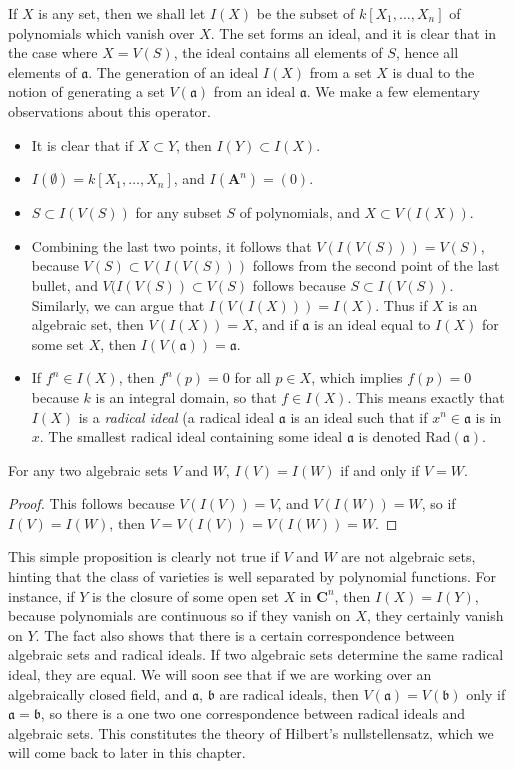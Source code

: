 If $X$ is any set, then we shall let $I(X)$ be the subset of $k[X_1, \dots, X_n]$ of polynomials which vanish over $X$. The set forms an ideal, and it is clear that in the case where $X = V(S)$, the ideal contains all elements of $S$, hence all elements of $\mathfrak{a}$. The generation of an ideal $I(X)$ from a set $X$ is dual to the notion of generating a set $V(\mathfrak{a})$ from an ideal $\mathfrak{a}$. We make a few elementary observations about this operator.
%
\begin{itemize}
    \item It is clear that if $X \subset Y$, then $I(Y) \subset I(X)$.
    \item $I(\emptyset) = k[X_1, \dots, X_n]$, and $I(\mathbf{A}^n) = (0)$.
    \item $S \subset I(V(S))$ for any subset $S$ of polynomials, and $X \subset V(I(X))$.
    \item Combining the last two points, it follows that $V(I(V(S))) = V(S)$, because $V(S) \subset V(I(V(S)))$ follows from the second point of the last bullet, and $V(I(V(S)) \subset V(S)$ follows because $S \subset I(V(S))$. Similarly, we can argue that $I(V(I(X))) = I(X)$. Thus if $X$ is an algebraic set, then $V(I(X)) = X$, and if $\mathfrak{a}$ is an ideal equal to $I(X)$ for some set $X$, then $I(V(\mathfrak{a})) = \mathfrak{a}$.
    \item If $f^n \in I(X)$, then $f^n(p) = 0$ for all $p \in X$, which implies $f(p) = 0$ because $k$ is an integral domain, so that $f \in I(X)$. This means exactly that $I(X)$ is a {\it radical ideal} (a radical ideal $\mathfrak{a}$ is an ideal such that if $x^n \in \mathfrak{a}$ is in $x$. The smallest radical ideal containing some ideal $\mathfrak{a}$ is denoted $\text{Rad}(\mathfrak{a})$.
\end{itemize}

\begin{prop}
    For any two algebraic sets $V$ and $W$, $I(V) = I(W)$ if and only if $V = W$.
\end{prop}
\begin{proof}
    This follows because $V(I(V)) = V$, and $V(I(W)) = W$, so if $I(V) = I(W)$, then $V = V(I(V)) = V(I(W)) = W$.
\end{proof}

This simple proposition is clearly not true if $V$ and $W$ are not algebraic sets, hinting that the class of varieties is well separated by polynomial functions. For instance, if $Y$ is the closure of some open set $X$ in $\mathbf{C}^n$, then $I(X) = I(Y)$, because polynomials are continuous so if they vanish on $X$, they certainly vanish on $Y$. The fact also shows that there is a certain correspondence between algebraic sets and radical ideals. If two algebraic sets determine the same radical ideal, they are equal. We will soon see that if we are working over an algebraically closed field, and $\mathfrak{a}$, $\mathfrak{b}$ are radical ideals, then $V(\mathfrak{a}) = V(\mathfrak{b})$ only if $\mathfrak{a} = \mathfrak{b}$, so there is a one two one correspondence between radical ideals and algebraic sets. This constitutes the theory of Hilbert's nullstellensatz, which we will come back to later in this chapter.


